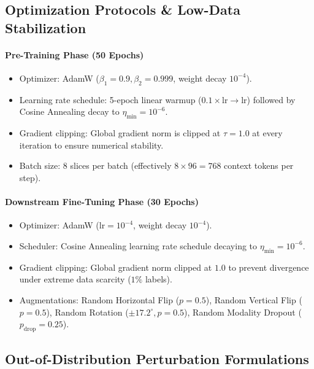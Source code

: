 \documentclass{article}
\begin{document}
\subsection{Optimization Protocols \& Low-Data Stabilization}

\paragraph{Pre-Training Phase (50 Epochs)}
\begin{itemize}
    \item Optimizer: AdamW ($\beta_1 = 0.9, \beta_2 = 0.999$, weight decay $10^{-4}$).
    \item Learning rate schedule: 5-epoch linear warmup ($0.1 \times \text{lr} \to \text{lr}$) followed by Cosine Annealing decay to $\eta_{\text{min}} = 10^{-6}$.
    \item Gradient clipping: Global gradient norm is clipped at $\tau = 1.0$ at every iteration to ensure numerical stability.
    \item Batch size: $8$ slices per batch (effectively $8 \times 96 = 768$ context tokens per step).
\end{itemize}

\paragraph{Downstream Fine-Tuning Phase (30 Epochs)}
\begin{itemize}
    \item Optimizer: AdamW ($\text{lr} = 10^{-4}$, weight decay $10^{-4}$).
    \item Scheduler: Cosine Annealing learning rate schedule decaying to $\eta_{\text{min}} = 10^{-6}$.
    \item Gradient clipping: Global gradient norm clipped at $1.0$ to prevent divergence under extreme data scarcity ($1\%$ labels).
    \item Augmentations: Random Horizontal Flip ($p=0.5$), Random Vertical Flip ($p=0.5$), Random Rotation ($\pm 17.2^\circ, p=0.5$), Random Modality Dropout ($p_{\text{drop}} = 0.25$).
\end{itemize}

\subsection{Out-of-Distribution Perturbation Formulations}
\end{document}
